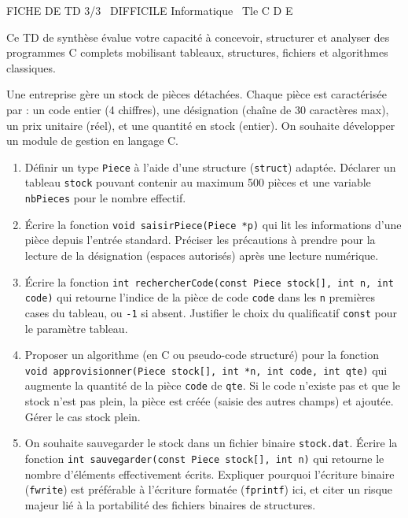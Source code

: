 \documentclass[11pt]{article}
\begin{document}
\begin{tcolorbox}[enhanced,colback=popink,colframe=popink,arc=10pt,boxrule=0pt,left=12pt,right=12pt,top=9pt,bottom=9pt]
{\color{white}\popxbold\small FICHE DE TD 3/3 \textbullet\ DIFFICILE \hfill Informatique \textbullet\ Tle C D E\par}
\end{tcolorbox}
\vspace{4pt}
Ce TD de synthèse évalue votre capacité à concevoir, structurer et analyser des programmes C complets mobilisant tableaux, structures, fichiers et algorithmes classiques.

\begin{exercice}
Une entreprise gère un stock de pièces détachées. Chaque pièce est caractérisée par : un code entier (4 chiffres), une désignation (chaîne de 30 caractères max), un prix unitaire (réel), et une quantité en stock (entier). On souhaite développer un module de gestion en langage C.

\begin{enumerate}
    \item Définir un type \texttt{Piece} à l'aide d'une structure (\texttt{struct}) adaptée. Déclarer un tableau \texttt{stock} pouvant contenir au maximum 500 pièces et une variable \texttt{nbPieces} pour le nombre effectif.
    \item Écrire la fonction \texttt{void saisirPiece(Piece *p)} qui lit les informations d'une pièce depuis l'entrée standard. Préciser les précautions à prendre pour la lecture de la désignation (espaces autorisés) après une lecture numérique.
    \item Écrire la fonction \texttt{int rechercherCode(const Piece stock[], int n, int code)} qui retourne l'indice de la pièce de code \texttt{code} dans les \texttt{n} premières cases du tableau, ou \texttt{-1} si absent. Justifier le choix du qualificatif \texttt{const} pour le paramètre tableau.
    \item Proposer un algorithme (en C ou pseudo-code structuré) pour la fonction \texttt{void approvisionner(Piece stock[], int *n, int code, int qte)} qui augmente la quantité de la pièce \texttt{code} de \texttt{qte}. Si le code n'existe pas et que le stock n'est pas plein, la pièce est créée (saisie des autres champs) et ajoutée. Gérer le cas stock plein.
    \item On souhaite sauvegarder le stock dans un fichier binaire \texttt{stock.dat}. Écrire la fonction \texttt{int sauvegarder(const Piece stock[], int n)} qui retourne le nombre d'éléments effectivement écrits. Expliquer pourquoi l'écriture binaire (\texttt{fwrite}) est préférable à l'écriture formatée (\texttt{fprintf}) ici, et citer un risque majeur lié à la portabilité des fichiers binaires de structures.
\end{enumerate}
\end{exercice}
\end{document}
